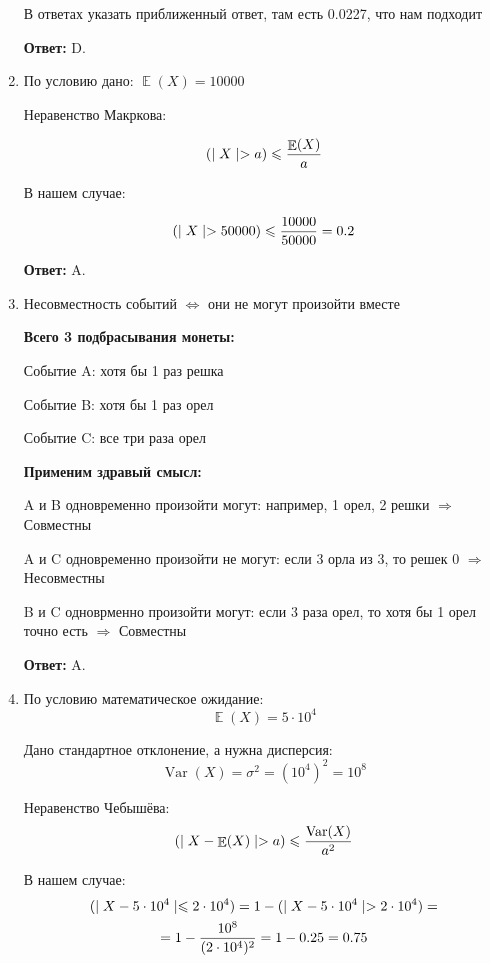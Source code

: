 \documentclass[a4paper]{article} %
\DeclareMathOperator{\Var}{Var}
\DeclareMathOperator{\E}{\mathbb{E}}
\let\P\relax
\DeclareMathOperator{\P}{\mathbb{P}}
\renewcommand{\leq}{\leqslant}
\begin{document}
\begin{enumerate}
    В ответах указать приближенный ответ, там есть 0.0227, что нам подходит
    
    \textbf{Ответ:} D.
    
    
    \item
    По условию дано: $\E(X) = 10000$
    
    Неравенство Макркова:
    
    \[
    \P(\mid X \mid > a) \leq \frac{\E(X)}{a}
    \]
    
    В нашем случае:
    
    \[
    \P(\mid X \mid > 50000) \leq \frac{10000}{50000} = 0.2
    \]
    
    \textbf{Ответ:} A.
    
    
    \item
    Несовместность событий $\Leftrightarrow$ они не могут произойти вместе
    
    \textbf{Всего 3 подбрасывания монеты:}
    
    Событие A: хотя бы 1 раз решка

    Событие B: хотя бы 1 раз орел

    Событие C: все три раза орел
    
    \textbf{Применим здравый смысл:}
    
    A и B одновременно произойти могут: например, 1 орел, 2 решки $\Rightarrow$ Совместны
    
    A и C одновременно произойти не могут: если 3 орла из 3, то решек 0 $\Rightarrow$ Несовместны
    
    B и C одноврменно произойти могут: если 3 раза орел, то хотя бы 1 орел точно есть $\Rightarrow$ Совместны
    
    \textbf{Ответ:} A.
    
    
    \item
    По условию математическое ожидание:
    \[
    \E(X) = 5\cdot10^4
    \]
    
    Дано стандартное отклонение, а нужна дисперсия:
    \[
    \Var(X) = \sigma^2 = (10^4)^2 = 10^8
    \]
    
    Неравенство Чебышёва:
    \[
    \P(\mid X - \E(X) \mid > a) \leq \frac{\Var(X)}{a^2}
    \]
    
    В нашем случае:
    \[
    \begin{gathered} \P(\mid X - 5\cdot10^4 \mid \leq 2\cdot10^4) = 1 -  \P(\mid X - 5\cdot10^4 \mid > 2\cdot10^4) = \\
    =1 - \frac{10^8}{(2 \cdot 10^4)^2} = 1 - 0.25 = 0.75 \end{gathered}
    \]
    

\end{enumerate}
\end{document}
